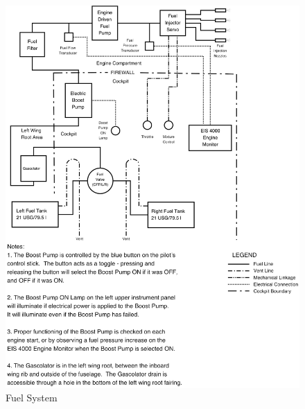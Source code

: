 \begin{figure}
[hb!]
\begin{center}
\includegraphics*[scale = 0.4]{../Diagrams/Fuel_system4_gc}
\end{center}

\caption{Fuel System}
\end{figure}
\clearpage

